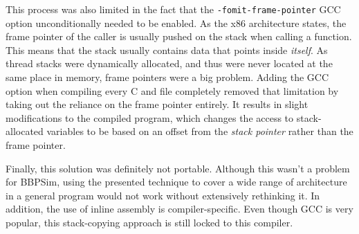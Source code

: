 This process was also limited in the fact that the \texttt{-fomit-frame-pointer} GCC option unconditionally needed to be enabled. As the x86 architecture states, the frame pointer of the caller is usually pushed on the stack when calling a function\cite{online:x86-abi}. This means that the stack usually contains data that points inside \textit{itself}. As thread stacks were dynamically allocated, and thus were never located at the same place in memory, frame pointers were a big problem. Adding the GCC option when compiling every C and \Cpp file completely removed that limitation by taking out the reliance on the frame pointer entirely. It results in slight modifications to the compiled program, which changes the access to stack-allocated variables to be based on an offset from the \textit{stack pointer} rather than the frame pointer\cite{online:omit-frame-pointer}.

Finally, this solution was definitely not portable. Although this wasn't a problem for BBPSim, using the presented technique to cover a wide range of architecture in a general program would not work without extensively rethinking it. In addition, the use of inline assembly is compiler-specific. Even though GCC is very popular, this stack-copying approach is still locked to this compiler. 

